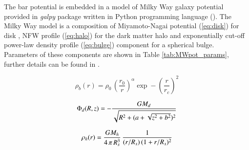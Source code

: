 \documentclass[a4paper,fleqn,usenatbib]{mnras}
\begin{document}
The bar potential is embedded in a model of Milky Way galaxy potential provided in \textit{galpy} package written in Python programming language (\cite{Bovy:2015}). The Milky Way model is a composition of Miyamoto-Nagai potential (\ref{eq:disk}) for disk \cite{MiyamotoNagai:1975}, NFW profile (\ref{eq:halo}) for the dark matter halo \cite{NFW:1996} and exponentially cut-off power-law density profile (\ref{eq:bulge}) component for a spherical bulge. Parameters of these components are shown in Table \ref{tab:MWpot_params}, further details can be found in \cite{Bovy:2015}.

\begin{equation}\label{eq:bulge}
	\rho_b(r)=\rho_0 \, \left(  \frac{r_0}{r} \right) ^{\alpha} \exp -\left( \frac{r}{r_c} \right)^2
\end{equation}

\begin{equation}\label{eq:disk}
	\Phi_d(R,z) = -\frac{GM_d}{\sqrt{R^2+(a+\sqrt{z^2+b^2})^2}}\\
\end{equation}

\begin{equation}\label{eq:halo}
	\rho_h(r) = \frac{GM_h}{4\,\pi\,R_s^3}\,\frac{1}{(r/R_s)\,(1+r/R_s)^{2}}\\
\end{equation}
\end{document}
